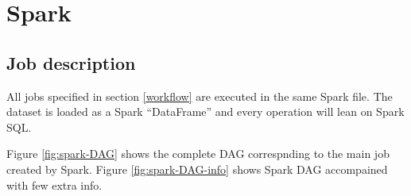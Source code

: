 \chapter{Spark}

\section{Job description}

All jobs specified in section \ref{workflow} are executed in the same Spark file. The dataset is loaded as a Spark ``DataFrame'' and every operation will lean on Spark SQL.

Figure \ref{fig:spark-DAG} shows the complete DAG correspnding to the main job created by Spark. Figure \ref{fig:spark-DAG-info} shows Spark DAG accompained with few extra info.

